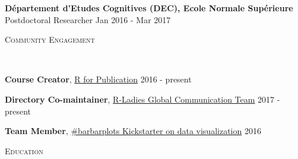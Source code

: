 \documentclass[9pt]{article}
\newenvironment{changemargin}[2]{%
  \begin{list}{}{%
    \setlength{\topsep}{0pt}%
    \setlength{\leftmargin}{#1}%
    \setlength{\rightmargin}{#2}%
    \setlength{\listparindent}{\parindent}%
    \setlength{\itemindent}{\parindent}%
    \setlength{\parsep}{\parskip}%
  }%
  \item[]}{\end{list}
}
\newcommand{\lineover}{
	\begin{changemargin}{-0.05in}{-0.05in}
		\vspace*{-8pt}
		\hrulefill \\
		\vspace*{-2pt}
	\end{changemargin}
}
\newcommand{\header}[1]{
	\begin{changemargin}{-0.5in}{-0.5in}
		\scshape{#1}\\
  	\lineover
	\end{changemargin}
}
\newenvironment{body} {
	\vspace*{-16pt}
	\begin{changemargin}{-0.25in}{-0.5in}
  }	
	{\end{changemargin}
}
\begin{document}
\begin{body}
	
	\textbf{D\'epartement d'Etudes Cognitives (DEC), Ecole Normale Sup\'erieure}\\
	Postdoctoral Researcher \hfill Jan 2016 - Mar 2017\\
	\medskip
	
\end{body}

\smallskip


\header{\color{red}Community Engagement}

\begin{body}
	\vspace{14pt}
	
	\textbf{Course Creator}, \href{https://pagepiccinini.com/r-course/}{\color{red}R for Publication} \hfill 2016 - present\\
	\medskip

	\textbf{Directory Co-maintainer}, \href{https://rladies.org/about-us/team/}{\color{red}R-Ladies Global Communication Team} \hfill 2017 - present\\
	\medskip
	


	\textbf{Team Member}, \href{https://barbarplots.github.io/}{\color{red}\#barbarplots Kickstarter on data visualization} \hfill 2016\\
	\medskip
		
\end{body}

\smallskip


\header{\color{red}Education}
\end{document}
